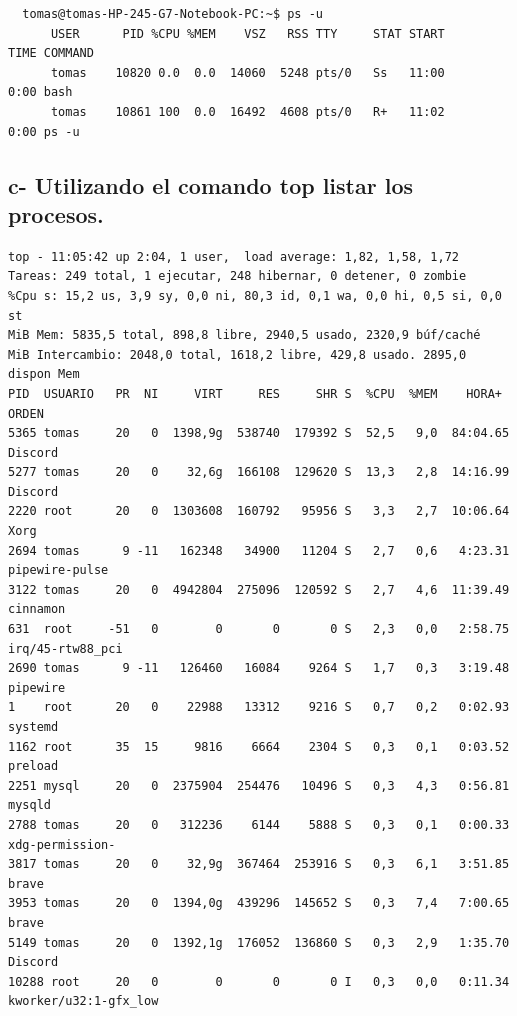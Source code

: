 \documentclass{article}
\begin{document}
\begin{commandline}
  \begin{verbatim}
  tomas@tomas-HP-245-G7-Notebook-PC:~$ ps -u
      USER      PID %CPU %MEM    VSZ   RSS TTY     STAT START      TIME COMMAND
      tomas    10820 0.0  0.0  14060  5248 pts/0   Ss   11:00      0:00 bash
      tomas    10861 100  0.0  16492  4608 pts/0   R+   11:02      0:00 ps -u
  \end{verbatim}
\end{commandline}


\subsection*{c- Utilizando el comando top listar los procesos.}

\begin{commandline}
 {\footnotesize
\begin{verbatim}
top - 11:05:42 up 2:04, 1 user,  load average: 1,82, 1,58, 1,72
Tareas: 249 total, 1 ejecutar, 248 hibernar, 0 detener, 0 zombie
%Cpu s: 15,2 us, 3,9 sy, 0,0 ni, 80,3 id, 0,1 wa, 0,0 hi, 0,5 si, 0,0 st
MiB Mem: 5835,5 total, 898,8 libre, 2940,5 usado, 2320,9 búf/caché
MiB Intercambio: 2048,0 total, 1618,2 libre, 429,8 usado. 2895,0 dispon Mem
PID  USUARIO   PR  NI     VIRT     RES     SHR S  %CPU  %MEM    HORA+   ORDEN
5365 tomas     20   0  1398,9g  538740  179392 S  52,5   9,0  84:04.65  Discord
5277 tomas     20   0    32,6g  166108  129620 S  13,3   2,8  14:16.99  Discord
2220 root      20   0  1303608  160792   95956 S   3,3   2,7  10:06.64  Xorg
2694 tomas      9 -11   162348   34900   11204 S   2,7   0,6   4:23.31  pipewire-pulse
3122 tomas     20   0  4942804  275096  120592 S   2,7   4,6  11:39.49  cinnamon
631  root     -51   0        0       0       0 S   2,3   0,0   2:58.75  irq/45-rtw88_pci
2690 tomas      9 -11   126460   16084    9264 S   1,7   0,3   3:19.48  pipewire
1    root      20   0    22988   13312    9216 S   0,7   0,2   0:02.93  systemd
1162 root      35  15     9816    6664    2304 S   0,3   0,1   0:03.52  preload
2251 mysql     20   0  2375904  254476   10496 S   0,3   4,3   0:56.81  mysqld
2788 tomas     20   0   312236    6144    5888 S   0,3   0,1   0:00.33  xdg-permission-
3817 tomas     20   0    32,9g  367464  253916 S   0,3   6,1   3:51.85  brave
3953 tomas     20   0  1394,0g  439296  145652 S   0,3   7,4   7:00.65  brave
5149 tomas     20   0  1392,1g  176052  136860 S   0,3   2,9   1:35.70  Discord
10288 root     20   0        0       0       0 I   0,3   0,0   0:11.34  kworker/u32:1-gfx_low

\end{verbatim}}
\end{commandline}
\end{document}
